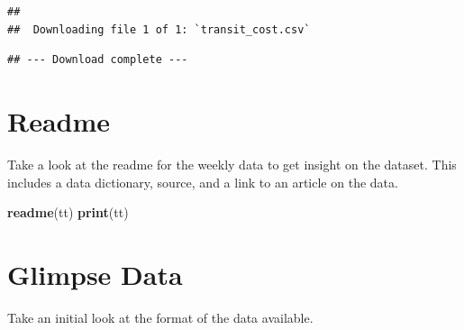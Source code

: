 \documentclass[]{article}
\newenvironment{Shaded}{\begin{snugshade}}{\end{snugshade}}
\newcommand{\CommentTok}[1]{\textcolor[rgb]{0.56,0.35,0.01}{\textit{#1}}}
\newcommand{\KeywordTok}[1]{\textcolor[rgb]{0.13,0.29,0.53}{\textbf{#1}}}
\newcommand{\NormalTok}[1]{#1}
\newcommand{\OperatorTok}[1]{\textcolor[rgb]{0.81,0.36,0.00}{\textbf{#1}}}
\newcommand{\StringTok}[1]{\textcolor[rgb]{0.31,0.60,0.02}{#1}}
\begin{document}
\begin{verbatim}
## 
##  Downloading file 1 of 1: `transit_cost.csv`
\end{verbatim}

\begin{verbatim}
## --- Download complete ---
\end{verbatim}

\begin{Shaded}
\end{Shaded}

\hypertarget{readme}{%
\section{Readme}\label{readme}}

Take a look at the readme for the weekly data to get insight on the
dataset. This includes a data dictionary, source, and a link to an
article on the data.

\begin{Shaded}
\begin{Highlighting}[]
\KeywordTok{readme}\NormalTok{(tt)}
\KeywordTok{print}\NormalTok{(tt)}
\end{Highlighting}
\end{Shaded}

\hypertarget{glimpse-data}{%
\section{Glimpse Data}\label{glimpse-data}}

Take an initial look at the format of the data available.

\begin{Shaded}
\end{Shaded}
\end{document}
